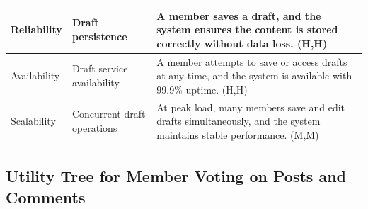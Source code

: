 \documentclass{article}
\begin{document}
\begin{table}[H]
\begin{tabular}{|p{3cm}|p{4cm}|p{7cm}|}
        Reliability
                                   & Draft persistence
                                   & A member saves a draft, and the system ensures the content is stored correctly without data loss. (H,H)                           \\
        \hline

        Availability
                                   & Draft service availability
                                   & A member attempts to save or access drafts at any time, and the system is available with 99.9\% uptime. (H,H)                     \\
        \hline

        Scalability
                                   & Concurrent draft operations
                                   & At peak load, many members save and edit drafts simultaneously, and the system maintains stable performance. (M,M)                \\
        \hline
    \end{tabular}
\end{table}

\subsection{Utility Tree for Member Voting on Posts and Comments}
\end{document}
